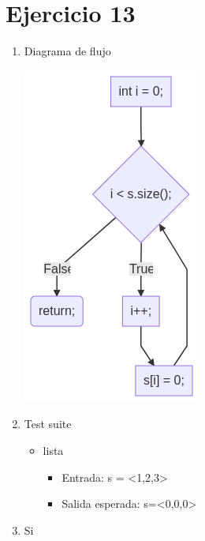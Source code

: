 \documentclass{article}
\begin{document}
\section*{Ejercicio 13}

\begin{enumerate}
    \item Diagrama de flujo
    
    \includegraphics[scale=0.65]{recursos/vaciarSecuencia.png}

    \item Test suite
        \begin{itemize}
            \item lista
                \begin{itemize}
                    \item Entrada: s = <1,2,3>
                    \item Salida esperada: s=<0,0,0>
                \end{itemize}
        \end{itemize}
    \item Si
\end{enumerate}
\end{document}
